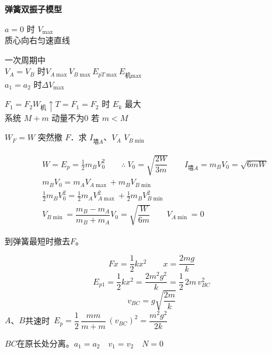 \textbf{弹簧双振子模型}

$a=0$ 时 $V_{\max}$\\
质心向右匀速直线

一次周期中\\
$V_A=V_B$ 时\quad $V_{A\max}$\quad $V_{B\max}$\quad $E_{pT\max}$\quad $E_{\text{机}\max}$\\
$a_1=a_2$ 时\quad $\Delta V_{\max}$

$F_1=F_2$\quad $W_{\text{机}}\uparrow$\quad $T=F_1=F_2$ 时 $E_k$ 最大\\
系统 $M+m$ 动量不为0
若 $m<M$

\begin{problem}
$W_F=W$ 突然撤 $F$．求 $I_{\text{墙}A}$、$V_A$ $V_{B\min}$
\begin{solution}
\begin{align*}
&W=E_p=\tfrac12 m_BV_0^2\qquad\therefore\ V_0=\sqrt{\dfrac{2W}{3m}}\qquad I_{\text{墙}A}=m_BV_0=\sqrt{6mW}\\
&m_BV_0=m_AV_{A\max}+m_BV_{B\min}\\
&\tfrac12 m_BV_0^2=\tfrac12 m_AV_{A\max}^2+\tfrac12 m_BV_{B\min}^2\\
&V_{B\min}=\dfrac{m_B-m_A}{m_B+m_A}V_0=\sqrt{\dfrac{W}{6m}}\qquad V_{A\min}=0
\end{align*}
\end{solution}
\end{problem}

到弹簧最短时撤去$F$。

\[
Fx=\frac{1}{2}kx^2\qquad x=\frac{2mg}{k}
\]
\[
E_{p1}=\frac{1}{2}kx^2=\frac{2m^2g^2}{k}=\frac{1}{2}\,2m\,v_{BC}^2
\]
\[
v_{BC}=g\sqrt{\frac{2m}{k}}
\]
$A$、$B$共速时\ $E_p=\dfrac{1}{2}\,\dfrac{mm}{m+m}\,(v_{BC})^2=\dfrac{m^2g^2}{2k}$

$BC$在原长处分离。\quad $a_1=a_2\quad v_1=v_2\quad N=0$

